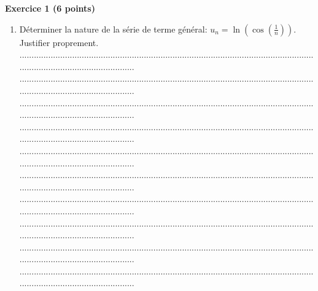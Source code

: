 \documentclass{article}
\begin{document}
\newpage
\noindent\textbf{Exercice 1 (6 points)}
\begin{footnotesize}
\begin{enumerate}
    \item Déterminer la nature de la série de terme général: $u_{n} = \ln(\cos(\frac{1}{n}))$. Justifier proprement.\newline\newline
    ...........................................................................................................................................................................\newline
    ...........................................................................................................................................................................\newline
    ...........................................................................................................................................................................\newline
    ...........................................................................................................................................................................\newline
    ...........................................................................................................................................................................\newline
    ...........................................................................................................................................................................\newline
    ...........................................................................................................................................................................\newline
    ...........................................................................................................................................................................\newline
    ...........................................................................................................................................................................\newline
    ...........................................................................................................................................................................\newline\newline

\end{enumerate}
\end{footnotesize}
\end{document}
